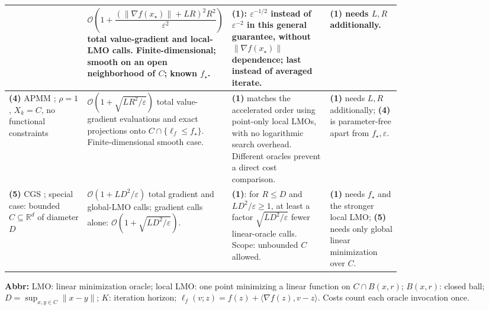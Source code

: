 \begin{table}[tp]
\begin{threeparttable}
\begin{tabularx}{\linewidth}{@{}>{\raggedright\arraybackslash}p{0.20\linewidth}>{\raggedright\arraybackslash}p{0.32\linewidth}>{\raggedright\arraybackslash}p{0.25\linewidth}>{\raggedright\arraybackslash}X@{}}
& $\mathcal{O}\!\left(1+\dfrac{(\|\nabla f(x_\star)\|+LR)^2R^2}{\varepsilon^2}\right)$ total value-gradient and local-LMO calls. Finite-dimensional; smooth on an open neighborhood of $C$; known $f_\star$.
& \textbf{(1)}: $\varepsilon^{-1/2}$ instead of $\varepsilon^{-2}$ in this general guarantee, without $\|\nabla f(x_\star)\|$ dependence; last instead of averaged iterate.
& \textbf{(1)} needs $L,R$ additionally. \\
\midrule
\textbf{(4)} APMM \citep[Alg.~1, Thm.~2.1]{kvAPMM2026v3}; $\rho=1$, $X_k=C$, no functional constraints
& $\mathcal{O}(1+\sqrt{LR^2/\varepsilon})$ total value-gradient evaluations and exact projections onto $C\cap\{\ell_f\le f_\star\}$. Finite-dimensional smooth case.
& \textbf{(1)} matches the accelerated order using point-only local LMOs, with no logarithmic search overhead. Different oracles prevent a direct cost comparison.
& \textbf{(1)} needs $L,R$ additionally; \textbf{(4)} is parameter-free apart from $f_\star,\varepsilon$. \\
\midrule
\textbf{(5)} CGS \citep[Cor.~3, 2014 preprint]{kvCGS2016}; special case: bounded $C\subseteq\mathbb{R}^d$ of diameter $D$
& $\mathcal{O}(1+LD^2/\varepsilon)$ total gradient and global-LMO calls; gradient calls alone: $\mathcal{O}(1+\sqrt{LD^2/\varepsilon})$.
& \textbf{(1)}: for $R\le D$ and $LD^2/\varepsilon\ge1$, at least a factor $\sqrt{LD^2/\varepsilon}$ fewer linear-oracle calls. Scope: unbounded $C$ allowed.
& \textbf{(1)} needs $f_\star$ and the stronger local LMO; \textbf{(5)} needs only global linear minimization over $C$. \\
\bottomrule
\end{tabularx}
\begin{tablenotes}[flushleft]\footnotesize
\item[] \textbf{Abbr:} LMO: linear minimization oracle; local LMO: one point minimizing a linear function on $C\cap B(x,r)$; $B(x,r)$: closed ball; $D=\sup_{x,y\in C}\|x-y\|$; $K$: iteration horizon; $\ell_f(v;z)=f(z)+\langle\nabla f(z),v-z\rangle$. Costs count each oracle invocation once.
\end{tablenotes}
\end{threeparttable}
\end{table}
\clearpage
